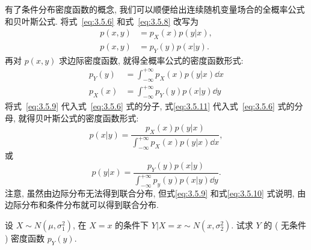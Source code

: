 	有了条件分布密度函数的概念,  我们可以顺便给出连续随机变量场合的全概率公式和贝叶斯公式. 将式~\ref{eq:3.5.6} 和式~\ref{eq:3.5.8} 改写为
	\begin{align}
		p(x,y)&=p_X(x)p(y|x),\label{eq:3.5.9}	\\
		p(x,y)&=p_Y(y)p(x|y). \label{eq:3.5.10}
	\end{align}
	再对 $p(x,y)$ 求边际密度函数, 就得全概率公式的密度函数形式:
	\begin{align}
		p_{Y}(y) &=\int_{-\infty}^{+\infty} p_{X}(x) p(y | x) \dd x\label{eq:3.5.11} \\
		p_{X}(x) &=\int_{-\infty}^{+\infty} p_{Y}(y) p(x | y) \dd y \label{eq:3.5.12}
	\end{align}
	将式~\ref{eq:3.5.9} 代入式~\ref{eq:3.5.6} 式的分子, 式\ref{eq:3.5.11} 代入式~\ref{eq:3.5.6} 式的分母,
	就得贝叶斯公式的密度函数形式:
	\begin{equation}
		p(x | y)=\frac{p_{X}(x) p(y | x)}{\int_{-\infty}^{+\infty} p_{X}(x) p(y | x) \dd x},\label{eq:3.5.13}
	\end{equation}
	或
	\begin{equation}
		p(y | x)=\frac{p_{Y}(y) p(x | y)}{\int_{-\infty}^{+\infty} p_{y}(y) p(x | y) \dd y}.\label{eq:3.5.14}
	\end{equation}
	注意, 虽然由边际分布无法得到联合分布, 但式\ref{eq:3.5.9} 和式\ref{eq:3.5.10} 式说明, 由边际分布和条件分布就可以得到联合分布.
	\begin{example}\label{exam:3.5.6}
		设 $X\sim N(\mu,\sigma_1^2)$, 在 $X=x$ 的条件下 $Y|X=x\sim N(x,\sigma_2^2)$. 试求 $Y$ 的 ( 无条件 ) 密度函数 $p_Y(y)$.
	\end{example}
